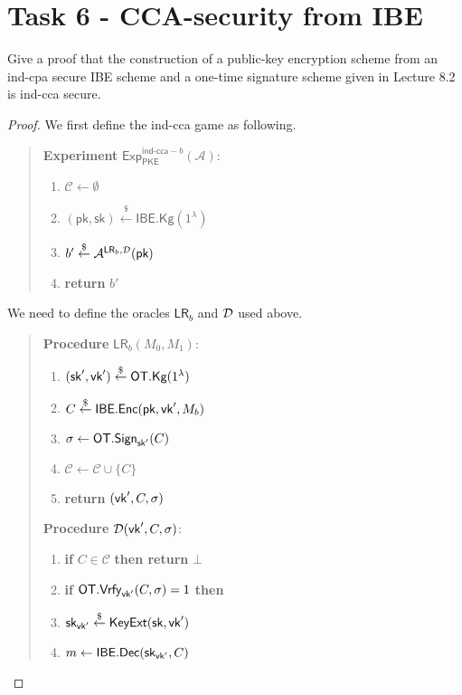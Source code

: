 \documentclass[12pt]{article}
\newcommand{\getsr}{\stackrel{\$}{\gets}}
\newcommand{\tab}{\hspace{0.3in}}
\newcommand{\Vrfy}{\textsf{Vrfy}}
\newcommand{\C}{\mathcal{C}}
\theoremstyle{definition}
\newcommand{\PKE}{\textsf{PKE}}
\newcommand{\Kg}{\textsf{Kg}}
\newcommand{\Enc}{\textsf{Enc}}
\newcommand{\Dec}{\textsf{Dec}}
\newcommand{\pk}{\textsf{pk}}
\newcommand{\sk}{\textsf{sk}}
\newcommand{\A}{\mathcal{A}}
\newcommand{\LR}{\textsf{LR}}
\begin{document}
\section{Task 6 - CCA-security from IBE}
Give a proof that the construction of a public-key encryption scheme from an ind-cpa
secure IBE scheme and a one-time signature scheme given in Lecture 8.2 is ind-cca secure.
\newcommand{\Exp}{\textsf{Exp}}
\newcommand{\cpa}{\textsf{ind-cpa}}
\newcommand{\cca}{\textsf{ind-cca}}
\newcommand{\msk}{\textsf{msk}}
\newcommand{\pp}{\textsf{pp}}
\newcommand{\IBE}{\textsf{IBE}}
\newcommand{\OT}{\textsf{OT}}
\newcommand{\KeyExt}{\textsf{KeyExt}}
\newcommand{\bad}{\textsf{bad}}
\begin{proof}
We first define the ind-cca game as following.
\begin{quote}
{\bf Experiment} $\Exp_{\PKE}^{\cca-b}(\A)$:
\begin{enumerate}
\item $\C \gets \emptyset$
\item $(\pk, \sk) \getsr \IBE.\Kg(1^\lambda)$
\item $b' \getsr \A^{\LR_b, \D}(\pk)$
\item {\bf return} $b'$
\end{enumerate}
\end{quote}
We need to define the oracles $\LR_b$ and $\mathcal{D}$ used above.
\begin{quote}
\begin{minipage}[t]{0.4\textwidth}
{\bf Procedure} $\LR_b(M_0,M_1)$:
\begin{enumerate}
\item $(\sk',\vk') \getsr \OT.\Kg(1^\lambda)$
\item $C \getsr \IBE.\Enc(\pk,\vk',M_b)$
\item $\sigma \gets \OT.\Sign_{\sk'}(C)$
\item $\C \gets \C \cup \{C\}$
\item {\bf return} $(\textsf{vk}', C, \sigma)$
\end{enumerate}
\end{minipage}
\begin{minipage}[t]{0.4\textwidth}
{\bf Procedure} $\mathcal{D}(\textsf{vk}', C,\sigma)$:
\begin{enumerate}
\item {\bf if} $C \in \C$ {\bf then return} $\bot$
\item {\bf if} $\OT.\Vrfy_{\vk'}(C,\sigma)=1$ {\bf then}
\item \tab $\sk_{\vk'} \getsr \KeyExt(\sk, \vk')$
\item \tab $m \gets \IBE.\Dec(\sk_{\vk'}, C)$

\end{enumerate}
\end{minipage}
\end{quote}
\end{proof}
\end{document}
